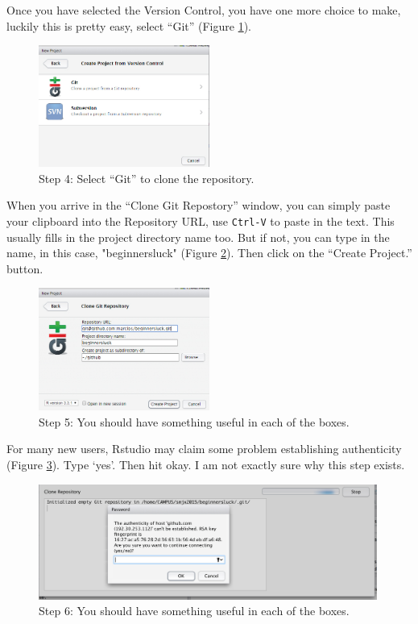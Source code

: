 \documentclass[12pt]{../SOP4_alpha}\usepackage[]{graphicx}\usepackage[]{color}
\begin{document}
\NP Once you have selected the Version Control, you have one more choice to make, luckily this is pretty easy, select ``Git'' (Figure \ref{fig:step4}).

\begin{figure}[H]
\centering
\includegraphics[width=0.5\textwidth]{graphics/RstudioNewProject2.jpg}
\caption{Step 4: Select ``Git'' to clone the repository.}
\label{fig:step4}
\end{figure}

When you arrive in the ``Clone Git Repostory'' window, you can simply paste your clipboard into the Repository URL, use \texttt{Ctrl-V} to paste in the text. This usually fills in the project directory name too. But if not, you can type in the name, in this case, "beginnersluck" (Figure \ref{fig:step5}). Then click on the ``Create Project.'' button. 

\begin{figure}[H]
\centering
\includegraphics[width=0.5\textwidth]{graphics/RstudioNewProject3.jpg}
\caption{Step 5: You should have something useful in each of the boxes.}
\label{fig:step5}
\end{figure}

\NP For many new users, Rstudio may claim some problem establishing authenticity (Figure \ref{fig:step6}). Type `yes'. Then hit okay. I am not exactly sure why this step exists. 

\begin{figure}[H]
\centering
\includegraphics[width=0.99\textwidth]{graphics/Authenticity.jpg}
\caption{Step 6: You should have something useful in each of the boxes.}
\label{fig:step6}
\end{figure}
\end{document}
